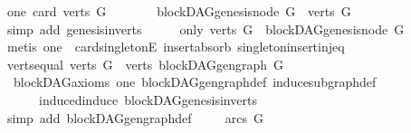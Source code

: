 \begin{isabellebody}
\ one{\isacharcolon}{\kern0pt}\ {\isachardoublequoteopen}card\ {\isacharparenleft}{\kern0pt}verts\ G{\isacharparenright}{\kern0pt}\ {\isacharequal}{\kern0pt}\ {}{\isachardoublequoteclose}\isanewline
\ \ \isamarkupfalse%
\ \isamarkupfalse%
\ {\isachardoublequoteopen}blockDAG{\isachardot}{\kern0pt}genesis{\isacharunderscore}{\kern0pt}node\ G\ {\isasymin}\ verts\ G{\isachardoublequoteclose}\isanewline
\ \ \ \ \isamarkupfalse%
\ {\isacharparenleft}{\kern0pt}simp\ add{\isacharcolon}{\kern0pt}\ genesis{\isacharunderscore}{\kern0pt}in{\isacharunderscore}{\kern0pt}verts{\isacharparenright}{\kern0pt}\isanewline
\ \ \isamarkupfalse%
\ \isamarkupfalse%
\ only{\isacharcolon}{\kern0pt}\ {\isachardoublequoteopen}verts\ G\ {\isacharequal}{\kern0pt}\ {\isacharbraceleft}{\kern0pt}blockDAG{\isachardot}{\kern0pt}genesis{\isacharunderscore}{\kern0pt}node\ G{\isacharbraceright}{\kern0pt}{\isachardoublequoteclose}\isanewline
\ \ \ \ \isamarkupfalse%
\ {\isacharparenleft}{\kern0pt}metis\ one\ \ card{\isacharunderscore}{\kern0pt}{}{\isacharunderscore}{\kern0pt}singletonE\ insert{\isacharunderscore}{\kern0pt}absorb\ singleton{\isacharunderscore}{\kern0pt}insert{\isacharunderscore}{\kern0pt}inj{\isacharunderscore}{\kern0pt}eq{\isacharprime}{\kern0pt}{\isacharparenright}{\kern0pt}\isanewline
\ \ \isamarkupfalse%
\ \isamarkupfalse%
\ verts{\isacharunderscore}{\kern0pt}equal{\isacharcolon}{\kern0pt}\ {\isachardoublequoteopen}verts\ G\ {\isacharequal}{\kern0pt}\ verts\ {\isacharparenleft}{\kern0pt}blockDAG{\isachardot}{\kern0pt}gen{\isacharunderscore}{\kern0pt}graph\ G{\isacharparenright}{\kern0pt}{\isachardoublequoteclose}\isanewline
\ \ \ \ \isamarkupfalse%
\ \ blockDAG{\isacharunderscore}{\kern0pt}axioms\ one\ blockDAG{\isachardot}{\kern0pt}gen{\isacharunderscore}{\kern0pt}graph{\isacharunderscore}{\kern0pt}def\ induce{\isacharunderscore}{\kern0pt}subgraph{\isacharunderscore}{\kern0pt}def\isanewline
\ \ \ \ \ \ induced{\isacharunderscore}{\kern0pt}induce\ blockDAG{\isachardot}{\kern0pt}genesis{\isacharunderscore}{\kern0pt}in{\isacharunderscore}{\kern0pt}verts\isanewline
\ \ \ \ \isamarkupfalse%
\ {\isacharparenleft}{\kern0pt}simp\ add{\isacharcolon}{\kern0pt}\ blockDAG{\isachardot}{\kern0pt}gen{\isacharunderscore}{\kern0pt}graph{\isacharunderscore}{\kern0pt}def{\isacharparenright}{\kern0pt}\ \isanewline
\ \ \isamarkupfalse%
\ {\isachardoublequoteopen}arcs\ G\ {\isacharequal}{\kern0pt}{\isacharbraceleft}{\kern0pt}{\isacharbraceright}{\kern0pt}{\isachardoublequoteclose}\ \isanewline

\end{isabellebody}
